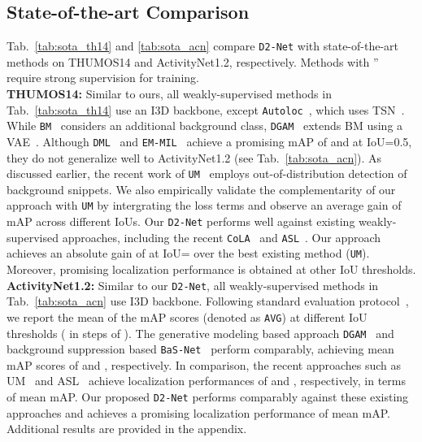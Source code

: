 \documentclass[10pt,twocolumn,letterpaper]{article}
\def\proposed{\texttt{D2-Net}{}}
\begin{document}
\subsection{State-of-the-art Comparison \label{sec:sota_compare}}
Tab.~\ref{tab:sota_th14} and \ref{tab:sota_acn} compare \proposed{} with state-of-the-art methods on THUMOS14 and ActivityNet1.2, respectively. Methods with '' require strong supervision for training.\\
\noindent\textbf{THUMOS14:} 
Similar to ours, all weakly-supervised methods in Tab.~\ref{tab:sota_th14} use an I3D backbone, except \texttt{Autoloc}~\cite{autoloc}, which uses TSN~\cite{tsn}. While \texttt{BM}~\cite{bg-modeling}  considers an additional background class, \texttt{DGAM}~\cite{dgam} extends BM using a VAE~\cite{kingma13iclr}. Although \texttt{DML}~\cite{dml} and \texttt{EM-MIL}~\cite{luo2020emmil} achieve a promising mAP of  and  at IoU=0.5, they do not generalize well to ActivityNet1.2 (see Tab.~\ref{tab:sota_acn}). As discussed earlier, the recent work of \texttt{UM}~\cite{uncertainty2020lee} employs out-of-distribution detection of background snippets. We also empirically validate the complementarity of our approach with \texttt{UM} by intergrating the loss terms and observe an average gain of  mAP across different IoUs. Our \proposed{} performs well against existing weakly-supervised approaches, including the recent \texttt{CoLA}~\cite{zhang2021cola} and \texttt{ASL}~\cite{ma2021weakly}. Our approach achieves an absolute gain of  at IoU= over the best existing method (\texttt{UM}). Moreover, promising localization performance is obtained at other IoU thresholds.\\
\noindent\textbf{ActivityNet1.2:} 
Similar to our \proposed, all weakly-supervised methods in Tab.~\ref{tab:sota_acn} use I3D backbone. Following standard evaluation protocol~\cite{activitynet}, we report the mean of the mAP scores (denoted as \texttt{AVG}) at different IoU thresholds ( in steps of ). The generative modeling based approach \texttt{DGAM}~\cite{dgam} and background suppression based \texttt{BaS-Net}~\cite{basnet} perform comparably, achieving mean mAP scores of  and , respectively. In comparison, the recent approaches such as UM~\cite{uncertainty2020lee} and ASL~\cite{ma2021weakly} achieve localization performances of  and , respectively, in terms of mean mAP. Our proposed \proposed{} performs comparably against these existing approaches and achieves a promising localization performance of  mean mAP. Additional results are provided in the appendix.\\
\end{document}
